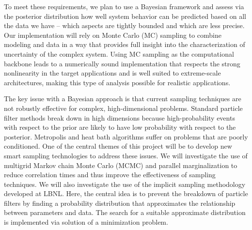 \documentclass[11pt]{article}
\newcommand{\MarginPar}[1]{\marginpar{%
\vskip-\baselineskip %
\raggedright\tiny\sffamily
\hrule\smallskip{\color{red}#1}\par\smallskip\hrule}}
\begin{document}
To meet these requirements, we plan to use a Bayesian framework and assess via the posterior distribution how well system behavior
can be predicted based on all the data we have -- which aspects are tightly bounded and which are less precise. Our implementation will rely on Monte Carlo (MC) sampling to combine modeling and data in a way that provides full insight into the characterization of uncertainty of the complex system. Using MC sampling as the computational backbone leads to a numerically sound implementation that respects the strong nonlinearity in the target applications and is well suited to extreme-scale architectures, making this type of analysis possible for realistic applications.

The key issue with a Bayesian approach is that current sampling techniques
are not robustly effective for complex, high-dimensional problems.
Standard particle filter methods break down in high dimensions because high-probability events 
with respect to the prior are likely to have low probability with respect to the posterior. 
Metropolis and heat bath algorithms suffer on problems that are poorly conditioned.
One of the central themes of this project will be to develop new smart sampling technologies 
to address these issues.
We will investigate the use of multigrid Markov chain Monte Carlo (MCMC) and parallel marginalization to reduce correlation
times and thus improve the effectiveness of sampling techniques.
We will also investigate the use of the implicit sampling methodology developed at LBNL.
Here, the central idea is to prevent the breakdown of particle filters by finding a probability distribution that approximates the
relationship between parameters and data. The search for a suitable approximate distribution is implemented
via solution of a minimization problem.
\end{document}
